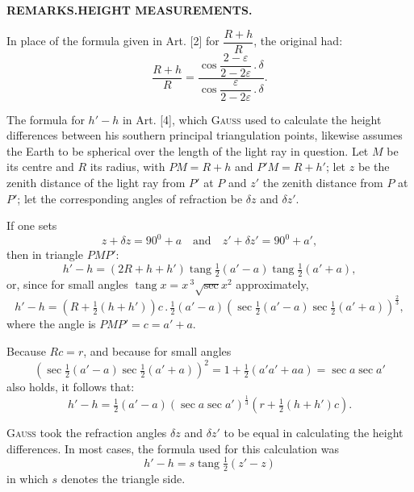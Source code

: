 \par\clearpage
\noindent\null\hfill{\small\textbf{REMARKS.\quad HEIGHT MEASUREMENTS.}}\hfill{}\par\medskip
\begingroup
\footnotesize
\setlength{\abovedisplayskip}{5pt}\setlength{\belowdisplayskip}{5pt}
\par\noindent\hspace*{\parindent}In place of the formula given in Art. [2] for
\(\dfrac{R+h}{R}\), the original had:
\[
\frac{R+h}{R}=
\frac{\cos\dfrac{2-\varepsilon}{2-2\varepsilon}\mathbin{.}\delta}
     {\cos\dfrac{\varepsilon}{2-2\varepsilon}\mathbin{.}\delta}.
\]
\par\noindent\hspace*{\parindent}The formula for \(h'-h\) in Art. [4], which \textsc{Gauss} used to
calculate the height differences between his southern principal triangulation points,
likewise assumes the Earth to be spherical over the length of the light ray
in question. Let \(M\) be its centre and \(R\) its radius,
with \(PM=R+h\) and \(P'M=R+h'\); let \(z\) be the zenith distance of the light ray
from \(P'\) at \(P\) and \(z'\) the zenith distance from \(P\) at \(P'\); let the corresponding
angles of refraction be \(\delta z\) and \(\delta z'\).
\par\noindent\hspace*{\parindent}If one sets
\[
z+\delta z=90^{0}+a\quad\text{and}\quad z'+\delta z'=90^{0}+a',
\]
\noindent then in triangle \(PMP'\):
\[
h'-h=(2R+h+h')\operatorname{tang}\tfrac12(a'-a)\operatorname{tang}\tfrac12(a'+a),
\]
\noindent or, since for small angles \(\operatorname{tang}x=x\,{}^3\!\surd\sec x^2\) approximately,
\[
h'-h=(R+\tfrac12(h+h'))c\mathbin{.}\tfrac12(a'-a)
(\sec\tfrac12(a'-a)\sec\tfrac12(a'+a))^{\frac23},
\]
\noindent where the angle is \(PMP'=c=a'+a\).
\par\noindent\hspace*{\parindent}Because \(Rc=r\), and because for small angles
\[
(\sec\tfrac12(a'-a)\sec\tfrac12(a'+a))^2
=1+\tfrac12(a'a'+aa)=\sec a\sec a'
\]
\noindent also holds, it follows that:
\[
h'-h=\tfrac12(a'-a)(\sec a\sec a')^{\frac13}(r+\tfrac12(h+h')c).
\]
\par\noindent\hspace*{\parindent}\textsc{Gauss} took the refraction angles
\(\delta z\) and \(\delta z'\) to be equal in calculating the height differences.
In most cases, the formula used for this calculation was
\[
h'-h=s\operatorname{tang}\tfrac12(z'-z)
\]
\noindent in which \(s\) denotes the triangle side.
